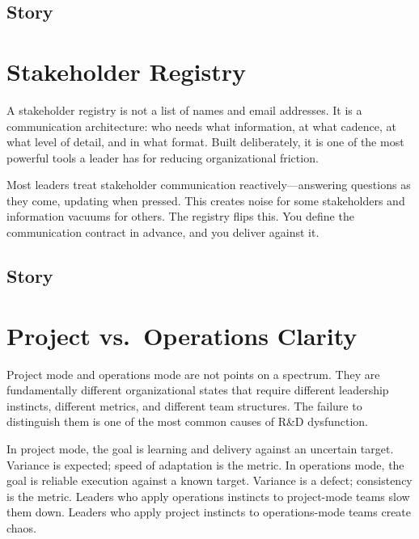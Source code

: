 \subsection{Story}

\section{Stakeholder Registry}


A stakeholder registry is not a list of names and email addresses. It is a
communication architecture: who needs what information, at what cadence, at what
level of detail, and in what format. Built deliberately, it is one of the most
powerful tools a leader has for reducing organizational friction.

Most leaders treat stakeholder communication reactively---answering questions as
they come, updating when pressed. This creates noise for some stakeholders and
information vacuums for others. The registry flips this. You define the
communication contract in advance, and you deliver against it.

\subsection{Story}

\section{Project vs.\ Operations Clarity}


Project mode and operations mode are not points on a spectrum. They are fundamentally
different organizational states that require different leadership instincts, different
metrics, and different team structures. The failure to distinguish them is one of the
most common causes of R\&D dysfunction.

In project mode, the goal is learning and delivery against an uncertain target.
Variance is expected; speed of adaptation is the metric. In operations mode, the
goal is reliable execution against a known target. Variance is a defect; consistency
is the metric. Leaders who apply operations instincts to project-mode teams slow
them down. Leaders who apply project instincts to operations-mode teams create chaos.

